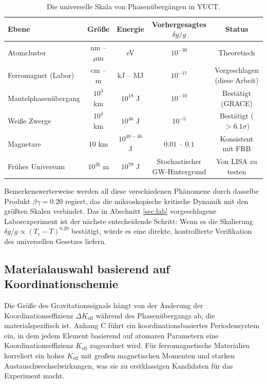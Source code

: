 \documentclass[12pt]{article}
\theoremstyle{remark}
\newcommand{\Keff}{K_{\mathrm{eff}}}
\begin{document}
	\begin{table}[htbp]
		\centering
		\caption{Die universelle Skala von Phasenübergängen in YUCT.}
		\label{tab:scale}
		\small
		\begin{tabular}{lcccc}
			\toprule
			\textbf{Ebene} & \textbf{Größe} & \textbf{Energie} & \textbf{Vorhergesagtes } \(\delta g/g\) & \textbf{Status} \\
			\midrule
			Atomcluster & nm – $\mu$m & eV & $10^{-30}$ & Theoretisch \\
			Ferromagnet (Labor) & cm – m & kJ – MJ & $10^{-17}$ & Vorgeschlagen (diese Arbeit) \\
			Mantelphasenübergang & $10^3$ km & $10^{18}$ J & $10^{-10}$ & Bestätigt (GRACE) \\
			Weiße Zwerge & $10^4$ km & $10^{46}$ J & $10^{-5}$ & Bestätigt ($>6.1\sigma$) \\
			Magnetare & $10$ km & $10^{40-46}$ J & $0.01$ – $0.1$ & Konsistent mit FRB \\
			Frühes Universum & $10^{26}$ m & $10^{70}$ J & Stochastischer GW-Hintergrund & Von LISA zu testen \\
			\bottomrule
		\end{tabular}
	\end{table}
	
	Bemerkenswerterweise werden all diese verschiedenen Phänomene durch dasselbe Produkt $\beta\gamma = 0.20$ regiert, das die mikroskopische kritische Dynamik mit den größten Skalen verbindet. Das in Abschnitt \ref{sec:lab} vorgeschlagene Laborexperiment ist der nächste entscheidende Schritt: Wenn es die Skalierung $\delta g/g \propto (T_c - T)^{0.20}$ bestätigt, würde es eine direkte, kontrollierte Verifikation des universellen Gesetzes liefern.
	
	\subsection{Materialauswahl basierend auf Koordinationschemie}
	\label{subsec:material-choice}
	
	Die Größe des Gravitationssignals hängt von der Änderung der Koordinationseffizienz \(\Delta \Keff\) während des Phasenübergangs ab, die materialspezifisch ist. Anhang C führt ein koordinationsbasiertes Periodensystem ein, in dem jedem Element basierend auf atomaren Parametern eine Koordinationseffizienz \(\Keff\) zugeordnet wird. Für ferromagnetische Materialien korreliert ein hohes \(\Keff\) mit großen magnetischen Momenten und starken Austauschwechselwirkungen, was sie zu erstklassigen Kandidaten für das Experiment macht.
	
\end{document}
